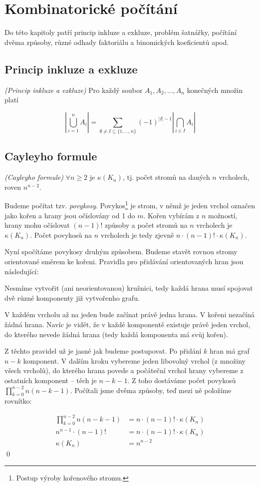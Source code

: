 \section{Kombinatorické počítání}
Do této kapitoly patří princip inkluze a exkluze, problém šatnářky, počítání dvěma
způsoby, různé odhady faktoriálu a binomických koeficientů apod.

\subsection{Princip inkluze a exkluze}

\vt \emph{(Princip inkluze a exkluze)} Pro každý soubor $A_1,A_2,\dots,A_n$
konečných množin platí

$$\left|\bigcup_{i=1}^n A_i\right| = \sum_{\emptyset\neq I\subseteq \{1,\dots,n\}}
(-1)^{|I|-1}\left|\bigcap_{i\in I}A_i\right|$$

\subsection{Cayleyho formule}

\vt \emph{(Cayleyho formule)} $\forall n\ge 2$ je $\kappa(K_n)$, tj. počet
stromů na daných $n$ vrcholech, roven $n^{n-2}$.

\dk Budeme počítat tzv. \emph{povykosy}. Povykos\footnote{Postup výroby kořenového
stromu.} je strom, v němž je jeden vrchol označen jako kořen a hrany jsou
očíslovány od 1 do $m$. Kořen vybírám z $n$ možností, hrany mohu očíslovat
$(n-1)!$ způsoby a počet stromů na $n$ vrcholech je $\kappa(K_n)$. Počet
povykosů na $n$ vrcholech je tedy zjevně $n\cdot(n-1)!\cdot\kappa(K_n)$.

Nyní spočítáme povykosy druhým způsobem. Budeme stavět rovnou stromy orientované
směrem ke kořeni. Pravidla pro přidávání orientovaných hran jsou následující:
\begin{enumerate*}
\item Nesmíme vytvořit (ani neorientovanou) kružnici, tedy každá hrana musí
spojovat dvě různé komponenty již vytvořenho grafu.
\item V každém vrcholu až na jeden bude začínat právě jedna hrana. V kořeni
nezačíná žádná hrana. Navíc je vidět, že v každé komponentě existuje právě jeden
vrchol, do kterého nevede žádná hrana (tedy každá komponenta má svůj kořen).
\end{enumerate*}
Z těchto pravidel už je jasné jak budeme postupovat. Po přidání $k$ hran má graf
$n-k$ komponent. V dalším kroku vybereme jeden libovolný vrchol (z množiny všech
vrcholů), do kterého hrana povede a počáteční vrchol hrany vybereme z ostatních
komponent -- těch je $n-k-1$. Z toho dostáváme počet povykosů $\prod_{k=0}^{n-2}
n(n-k-1)$. Počítali jsme dvěma způsoby, teď mezi ně položíme rovnítko:

\begin{align*}
\prod_{k=0}^{n-2} n(n-k-1) &= n\cdot(n-1)!\cdot\kappa(K_n) \\
n^{n-1}\cdot (n-1)! &= n\cdot(n-1)!\cdot\kappa(K_n) \\
\kappa(K_n) &= n^{n-2}
\end{align*}
\qed


